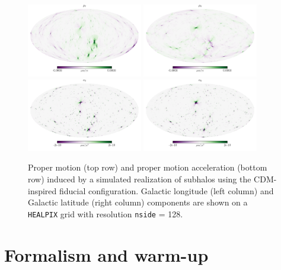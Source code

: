 \documentclass[prd,aps,10pt,nofootinbib,twocolumn,superscriptaddress,preprintnumbers,balancelastpage,longbibliography]{revtex4-1}
\begin{document}

\begin{figure}[tbp]
  \centering
  \includegraphics[width=0.45\textwidth]{plots/mu_l}
  \includegraphics[width=0.45\textwidth]{plots/mu_b}
  \includegraphics[width=0.45\textwidth]{plots/alpha_l}
  \includegraphics[width=0.45\textwidth]{plots/alpha_b}
  \caption{Proper motion (top row) and proper motion acceleration (bottom row) induced by a simulated realization of subhalos using the CDM-inspired fiducial configuration. Galactic longitude (left column) and Galactic latitude (right column) components are shown on a \texttt{HEALPIX} grid with resolution \texttt{nside} = 128.}
  \label{fig:population_maps}
\end{figure}


\section{Formalism and warm-up}
\label{sec:singlesh}
\end{document}
